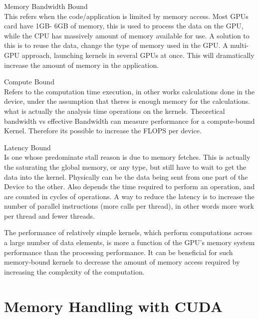 \begin{description}

 \item{Memory Bandwidth Bound} \hfill \\
 This refers when the code/application is limited by memory access. Most GPUs card have 1GB- 6GB of memory, this is used to process the data on the GPU, while the CPU has massively amount of memory available for use. A solution to this is to reuse the data, change the type of memory used in the GPU. A multi-GPU approach, launching kernels in several GPUs at once. This will dramatically increase the amount of memory in the application.

  \item{Compute Bound} \hfill \\
Refers to the computation time execution, in other works calculations done in the device, under the assumption that  theres is enough memory for the calculations. what is actually the analysis time operations on the kernels. Theoretical bandwidth vs  effective Bandwidth can measure performance for a compute-bound Kernel. Therefore its possible to increase the FLOPS per device.

 \item{Latency Bound} \hfill \\
 Is one whose predominate stall reason is due to memory fetches. This is actually the saturating the global memory, or any type, but still have to wait to get the data into the kernel. Physically can be the data being sent from one part of the Device to the other. Also depends the time required to perform an operation, and are counted in cycles of operations. A way to reduce the latency is to increase the number of parallel instructions (more  calls per thread), in other words more work per thread and fewer threads.
 \end{description}

The performance of relatively simple kernels, which perform computations across a large number of data elements, is more a function of the GPU's memory system performance than the processing performance. It can be beneficial for such memory-bound kernels to decrease the amount of memory access required by increasing the complexity of the computation. \cite{cook}

\section{Memory Handling with CUDA}

